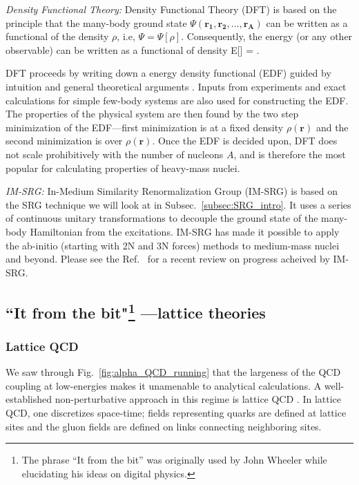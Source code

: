 	\li
	\emph{Density Functional Theory:} Density Functional Theory (DFT) is based
	on the principle that the many-body ground state $\Psi(\bm{r_1}, \bm{r_2},
	\ldots, \bm{r_A})$ can be written as a functional of the density $\rho$,
	i.e, $\Psi = \Psi[\rho]$.
	Consequently, the energy (or any other observable) can be written
	as a functional of density
	\beq
	E[\rho] =  \;.
	\eeq

	DFT proceeds by writing down a energy density functional (EDF) guided by
	intuition and general theoretical arguments
	\cite{Drut:2009ce, Dobaczewski:2010gr}.  Inputs from experiments
	and exact calculations for simple few-body systems are also used for
	constructing the EDF.  The properties of the physical system are then found
	by the two step minimization of the EDF---first minimization is at a fixed
	density $\rho(\bm{r})$ and the second minimization is over $\rho(\bm{r})$.
	Once the EDF is decided upon, DFT does not scale prohibitively with
	the number of nucleons $A$, and is therefore the most popular for
	calculating properties of heavy-mass nuclei.

	\li
	\emph{IM-SRG:} In-Medium Similarity Renormalization Group (IM-SRG) is
	based on the SRG technique we will look at in Subsec.~\ref{subsec:SRG_intro}.
	It uses a series of continuous unitary transformations to decouple
	the ground state of the many-body Hamiltonian from the excitations.
	IM-SRG has made it possible to apply the ab-initio (starting with 2N and
	3N forces) methods to medium-mass nuclei and beyond.  Please see the
	Ref.~\cite{Hergert:2015awm} for a recent review on progress acheived by
	IM-SRG.
	\ei

	\subsection[``It from the bit"---lattice theories]%
	{``It from the bit"\footnote{The phrase ``It from the bit'' was originally
	used by John Wheeler while elucidating his ideas on digital physics.}
	---lattice theories}
	\label{subsec:lattice_theories}

	\medskip
	\subsubsection{Lattice QCD}

	We saw through Fig.~\ref{fig:alpha_QCD_running} that the largeness of the
	QCD coupling at low-energies makes it unamenable to analytical calculations.
	A well-established non-perturbative approach in this regime is lattice
	QCD \cite{Savage:2015eya}.  In lattice QCD, one discretizes space-time;
	fields representing quarks are defined at lattice sites and
	the gluon fields are defined on links connecting neighboring sites.

